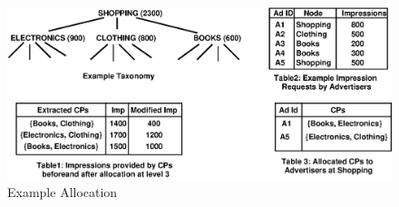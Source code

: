     
\begin{figure}
  \centering
\includegraphics[scale=0.7]{visuals/ExampleAllocationDASFAA.eps}
  \caption{Example Allocation}
  \label{example_allocation}
\end{figure}


